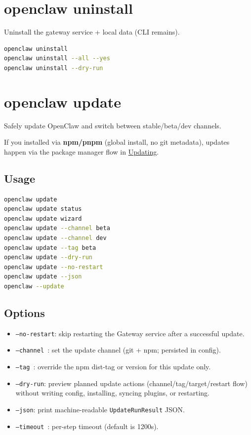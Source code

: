 \section{openclaw uninstall}


Uninstall the gateway service + local data (CLI remains).

\begin{lstlisting}[language=bash]
openclaw uninstall
openclaw uninstall --all --yes
openclaw uninstall --dry-run
\end{lstlisting}



\clearpage

\section{openclaw update}


Safely update OpenClaw and switch between stable/beta/dev channels.

If you installed via \textbf{npm/pnpm} (global install, no git metadata), updates happen via the package manager flow in \href{/install/updating}{Updating}.

\subsection{Usage}


\begin{lstlisting}[language=bash]
openclaw update
openclaw update status
openclaw update wizard
openclaw update --channel beta
openclaw update --channel dev
openclaw update --tag beta
openclaw update --dry-run
openclaw update --no-restart
openclaw update --json
openclaw --update
\end{lstlisting}


\subsection{Options}


\begin{itemize}
  \item \texttt{--no-restart}: skip restarting the Gateway service after a successful update.
  \item \texttt{--channel }: set the update channel (git + npm; persisted in config).
  \item \texttt{--tag }: override the npm dist-tag or version for this update only.
  \item \texttt{--dry-run}: preview planned update actions (channel/tag/target/restart flow) without writing config, installing, syncing plugins, or restarting.
  \item \texttt{--json}: print machine-readable \texttt{UpdateRunResult} JSON.
  \item \texttt{--timeout }: per-step timeout (default is 1200s).
\end{itemize}


